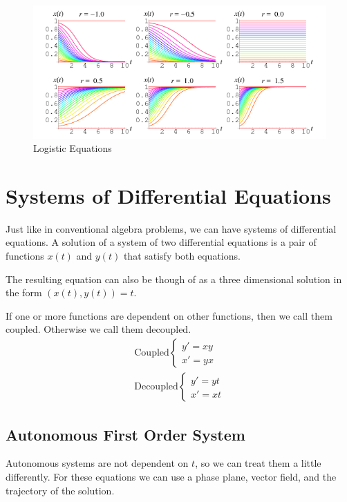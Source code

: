 \documentclass[12pt, landscape, twocolumn]{article}
\begin{document}
\begin{enumerate}
\begin{figure}[h!]\label{fig:logeq}
    \centering
        \includegraphics[scale=0.5]{./img/LogisticEquation.png}
    \caption{Logistic Equations}
\end{figure}

\end{enumerate}

\section{Systems of Differential Equations}

Just like in conventional algebra problems, we can have systems of differential equations. A solution of a system of two differential equations is a pair of functions $x(t)$ and $y(t)$ that satisfy both equations.

The resulting equation can also be though of as a three dimensional solution in the form $(x(t), y(t)) = t$.

If one or more functions are dependent on other functions, then we call them coupled. Otherwise we call them decoupled.
\[
\begin{aligned}
\text{Coupled}
\begin{cases}
y\prime = xy\\
x\prime = yx
\end{cases}\\
\text{Decoupled}
\begin{cases}
y\prime = yt\\
x\prime = xt
\end{cases}
\end{aligned}
\]

    \subsection{Autonomous First Order System}
    Autonomous systems are not dependent on $t$, so we can treat them a little differently. For these equations we can use a phase plane, vector field, and the trajectory of the solution.
\end{document}
